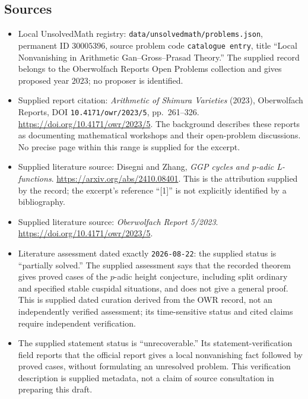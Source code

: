 \documentclass[11pt]{article}
\begin{document}
\subsection{Sources}
\begin{itemize}
\item Local UnsolvedMath registry: \texttt{data/unsolvedmath/problems.json}, permanent ID \(30005396\), source problem code \texttt{catalogue entry}, title ``Local Nonvanishing in Arithmetic Gan--Gross--Prasad Theory.'' The supplied record belongs to the Oberwolfach Reports Open Problems collection and gives proposed year \(2023\); no proposer is identified.
\item Supplied report citation: \emph{Arithmetic of Shimura Varieties} (2023), Oberwolfach Reports, DOI \texttt{10.4171/owr/2023/5}, pp.\ 261--326. \url{https://doi.org/10.4171/owr/2023/5}. The background describes these reports as documenting mathematical workshops and their open-problem discussions. No precise page within this range is supplied for the excerpt.
\item Supplied literature source: Disegni and Zhang, \emph{GGP cycles and p-adic L-functions}. \url{https://arxiv.org/abs/2410.08401}. This is the attribution supplied by the record; the excerpt's reference ``[1]'' is not explicitly identified by a bibliography.
\item Supplied literature source: \emph{Oberwolfach Report 5/2023}. \url{https://doi.org/10.4171/owr/2023/5}.
\item Literature assessment dated exactly \texttt{2026-08-22}: the supplied status is ``partially solved.'' The supplied assessment says that the recorded theorem gives proved cases of the \(p\)-adic height conjecture, including split ordinary and specified stable cuspidal situations, and does not give a general proof. This is supplied dated curation derived from the OWR record, not an independently verified assessment; its time-sensitive status and cited claims require independent verification.
\item The supplied statement status is ``unrecoverable.'' Its statement-verification field reports that the official report gives a local nonvanishing fact followed by proved cases, without formulating an unresolved problem. This verification description is supplied metadata, not a claim of source consultation in preparing this draft.
\end{itemize}
\end{document}
